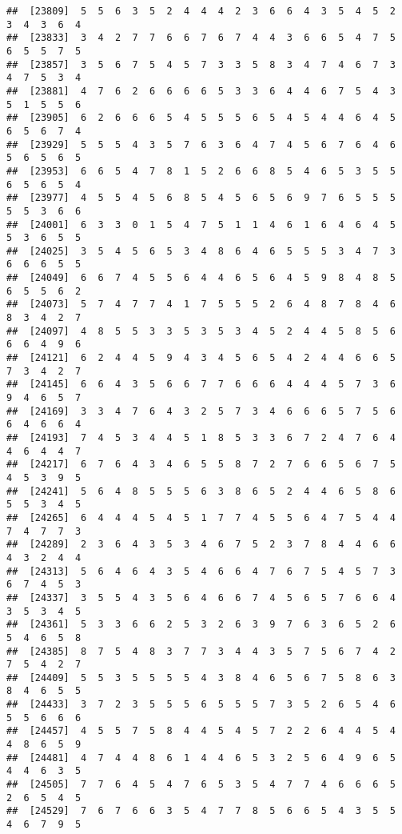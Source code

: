 \documentclass[
]{book}
\begin{document}
\begin{verbatim}
##  [23809]  5  5  6  3  5  2  4  4  4  2  3  6  6  4  3  5  4  5  2  3  4  3  6  4
##  [23833]  3  4  2  7  7  6  6  7  6  7  4  4  3  6  6  5  4  7  5  6  5  5  7  5
##  [23857]  3  5  6  7  5  4  5  7  3  3  5  8  3  4  7  4  6  7  3  4  7  5  3  4
##  [23881]  4  7  6  2  6  6  6  6  5  3  3  6  4  4  6  7  5  4  3  5  1  5  5  6
##  [23905]  6  2  6  6  6  5  4  5  5  5  6  5  4  5  4  4  6  4  5  6  5  6  7  4
##  [23929]  5  5  5  4  3  5  7  6  3  6  4  7  4  5  6  7  6  4  6  5  6  5  6  5
##  [23953]  6  6  5  4  7  8  1  5  2  6  6  8  5  4  6  5  3  5  5  6  5  6  5  4
##  [23977]  4  5  5  4  5  6  8  5  4  5  6  5  6  9  7  6  5  5  5  5  5  3  6  6
##  [24001]  6  3  3  0  1  5  4  7  5  1  1  4  6  1  6  4  6  4  5  5  3  6  5  5
##  [24025]  3  5  4  5  6  5  3  4  8  6  4  6  5  5  5  3  4  7  3  6  6  6  5  5
##  [24049]  6  6  7  4  5  5  6  4  4  6  5  6  4  5  9  8  4  8  5  6  5  5  6  2
##  [24073]  5  7  4  7  7  4  1  7  5  5  5  2  6  4  8  7  8  4  6  8  3  4  2  7
##  [24097]  4  8  5  5  3  3  5  3  5  3  4  5  2  4  4  5  8  5  6  6  6  4  9  6
##  [24121]  6  2  4  4  5  9  4  3  4  5  6  5  4  2  4  4  6  6  5  7  3  4  2  7
##  [24145]  6  6  4  3  5  6  6  7  7  6  6  6  4  4  4  5  7  3  6  9  4  6  5  7
##  [24169]  3  3  4  7  6  4  3  2  5  7  3  4  6  6  6  5  7  5  6  6  4  6  6  4
##  [24193]  7  4  5  3  4  4  5  1  8  5  3  3  6  7  2  4  7  6  4  4  6  4  4  7
##  [24217]  6  7  6  4  3  4  6  5  5  8  7  2  7  6  6  5  6  7  5  4  5  3  9  5
##  [24241]  5  6  4  8  5  5  5  6  3  8  6  5  2  4  4  6  5  8  6  5  5  3  4  5
##  [24265]  6  4  4  4  5  4  5  1  7  7  4  5  5  6  4  7  5  4  4  7  4  7  7  3
##  [24289]  2  3  6  4  3  5  3  4  6  7  5  2  3  7  8  4  4  6  6  4  3  2  4  4
##  [24313]  5  6  4  6  4  3  5  4  6  6  4  7  6  7  5  4  5  7  3  6  7  4  5  3
##  [24337]  3  5  5  4  3  5  6  4  6  6  7  4  5  6  5  7  6  6  4  3  5  3  4  5
##  [24361]  5  3  3  6  6  2  5  3  2  6  3  9  7  6  3  6  5  2  6  5  4  6  5  8
##  [24385]  8  7  5  4  8  3  7  7  3  4  4  3  5  7  5  6  7  4  2  7  5  4  2  7
##  [24409]  5  5  3  5  5  5  5  4  3  8  4  6  5  6  7  5  8  6  3  8  4  6  5  5
##  [24433]  3  7  2  3  5  5  5  6  5  5  5  7  3  5  2  6  5  4  6  5  5  6  6  6
##  [24457]  4  5  5  7  5  8  4  4  5  4  5  7  2  2  6  4  4  5  4  4  8  6  5  9
##  [24481]  4  7  4  4  8  6  1  4  4  6  5  3  2  5  6  4  9  6  5  4  4  6  3  5
##  [24505]  7  7  6  4  5  4  7  6  5  3  5  4  7  7  4  6  6  6  5  2  6  5  4  5
##  [24529]  7  6  7  6  6  3  5  4  7  7  8  5  6  6  5  4  3  5  5  4  6  7  9  5

\end{verbatim}
\end{document}
